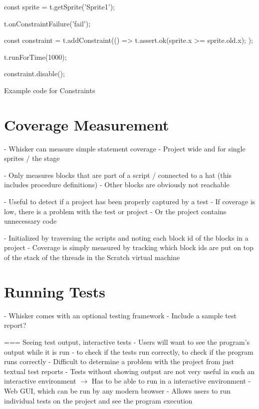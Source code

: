 \begin{listing}[ht]
    \centering
    \begin{javascriptcode}
        const sprite = t.getSprite('Sprite1');

        t.onConstraintFailure('fail');

        const constraint = t.addConstraint(() => {
            t.assert.ok(sprite.x >= sprite.old.x);
        });

        t.runForTime(1000);

        constraint.disable();
    \end{javascriptcode}
    \vspace{-\bigskipamount}
    \caption{Example code for Constraints}
    \label{fig:example_code_for_constraints}
\end{listing}

\section{Coverage Measurement}
- Whisker can measure simple statement coverage
- Project wide and for single sprites / the stage

- Only measures blocks that are part of a script / connected to a hat (this includes procedure definitions)
- Other blocks are obviously not reachable

- Useful to detect if a project has been properly captured by a test
    - If coverage is low, there is a problem with the test or project
    - Or the project contains unnecessary code

- Initialized by traversing the scripts and noting each block id of the blocks in a project
- Coverage is simply measured by tracking which block ids are put on top of the stack of the threads in the Scratch virtual machine

\section{Running Tests}
\label{sec:running_tests}
- Whisker comes with an optional testing framework
- Include a sample test report?

=== Seeing test output, interactive tests
- Users will want to see the program's output while it is run
    - to check if the tests run correctly, to check if the program runs correctly
    - Difficult to determine a problem with the project from just textual test reports
    - Tests without showing output are not very useful in such an interactive environment
$\rightarrow$ Has to be able to run in a interactive environment
    - Web GUI, which can be run by any modern browser
    - Allows users to run individual tests on the project and see the program execution

